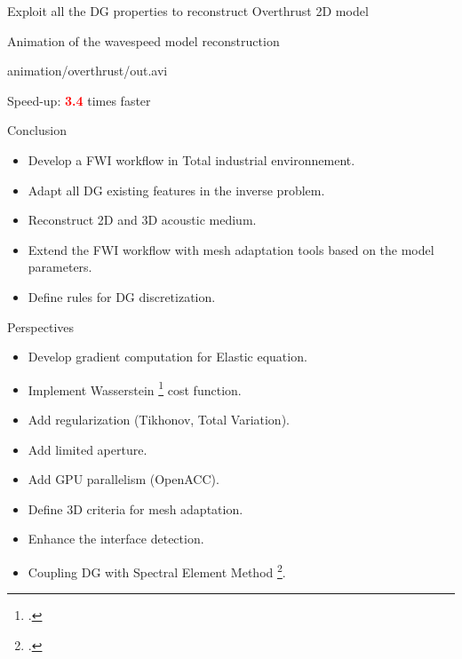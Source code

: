\begin{frame}{Exploit all the DG properties to reconstruct Overthrust 2D model}
\begin{overprint}

  \vspace{-1.0cm}
  \begin{block}{Animation of the wavespeed model reconstruction}
      \begin{center}
            {animation/overthrust/out.avi}
      \end{center}
    \end{block}
  Speed-up: \textcolor{red}{\textbf{3.4}} times faster
\end{overprint}

\end{frame}


\begin{frame}{Conclusion}
  \begin{itemize}
  \item Develop a FWI workflow in Total industrial environnement.
  \item Adapt all DG  existing features in the inverse problem.
  \item Reconstruct 2D and 3D acoustic medium.
  \item Extend the FWI workflow with mesh adaptation tools based on the model parameters.
  \item Define rules for DG discretization.
    \end{itemize}
\end{frame}

\begin{frame}{Perspectives}
  \begin{itemize}
    \item Develop gradient computation for Elastic equation.
    \item Implement Wasserstein \footcite{yangApplicationOptimalTransport2017} cost function.
    \item Add regularization (Tikhonov, Total Variation).
  \end{itemize}
  \vspace{0.5cm}
    \begin{itemize}
    \item Add limited aperture.
    \item Add GPU parallelism (OpenACC).
    \item Define 3D criteria for mesh adaptation.
    \item Enhance the interface detection.
    \item Coupling DG with Spectral Element Method \footcite{citrainHybridFiniteElement2019}.
  \end{itemize}
  \end{frame}
